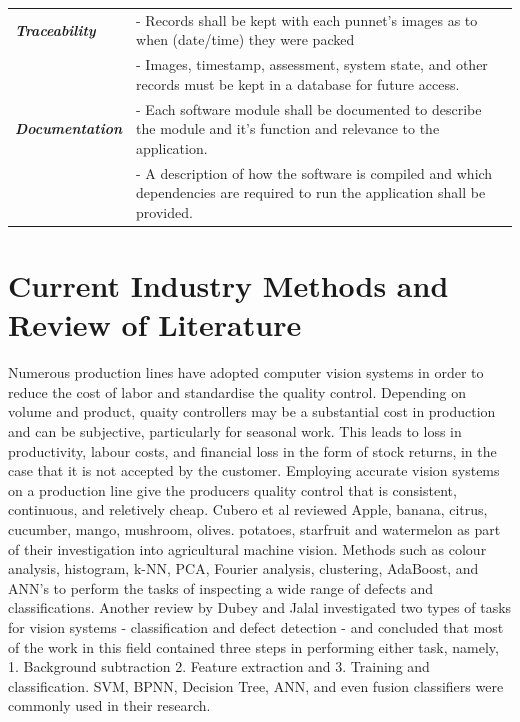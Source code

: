 \documentclass[fleqn,twoside]{article}
\begin{document}
\begin{table}[t!]
\begin{tabular*}{\textwidth}{p{3cm}p{13cm}}
		\midrule
		\textbf{\textit{Traceability}}		& - Records shall be kept with each punnet's images as to when (date/time) they were packed  \\
							& - Images, timestamp, assessment, system state, and other records must be kept in a database for future access. \\
		\midrule
		\textbf{\textit{Documentation}}	& - Each software module shall be documented to describe the module and it's function and relevance to the application.  \\
							& - A description of how the software is compiled and which dependencies are required to run the application shall be provided. \\
		\bottomrule
	\end{tabular*}
\end{table}






\newpage

\section{Current Industry Methods and Review of Literature}
\label{lab:lit}

Numerous production lines have adopted computer vision systems in order to reduce the cost of labor and standardise the quality control. Depending on volume and product, quaity controllers may be a substantial cost in production and can be subjective, particularly for seasonal work. This leads to loss in productivity, labour costs, and financial loss in the form of stock returns, in the case that it is not accepted by the customer. Employing accurate vision systems on a production line give the producers quality control that is consistent, continuous, and reletively cheap. Cubero et al \cite{cubero} reviewed Apple, banana, citrus, cucumber, mango, mushroom, olives. potatoes, starfruit and watermelon as part of their investigation into agricultural machine vision. Methods such as colour analysis, histogram, k-NN, PCA, Fourier analysis, clustering, AdaBoost, and ANN's to perform the tasks of inspecting a wide range of defects and classifications. Another review by Dubey and Jalal \cite{dubey} investigated two types of tasks for vision systems - classification and defect detection - and concluded that most of the work in this field contained three steps in performing either task, namely, 1. Background subtraction 2. Feature extraction and 3. Training and classification. SVM, BPNN, Decision Tree, ANN, and even fusion classifiers were commonly used in their research.
\end{document}
